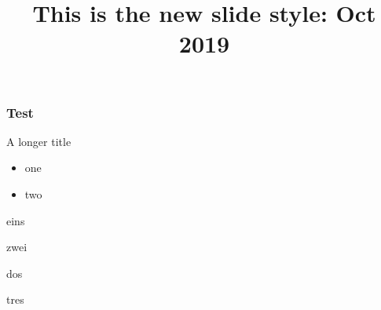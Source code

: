 \documentclass{beamer}
\begin{document}
\begin{frame}
\title{This is the new slide style: \newline Oct 2019}
\titlepage
\end{frame}
\begin{frame}
	\frametitle{Test}
	
\end{frame}
\begin{frame}{A longer title} 
	\begin{itemize}
		\item one
		\item two
	\end{itemize}
	\begin{itemizes}
		\item eins
		\item zwei
	\end{itemizes}
	\begin{itemizel}
		\item dos
		\item tres
	\end{itemizel}
\end{frame}
\end{document}
